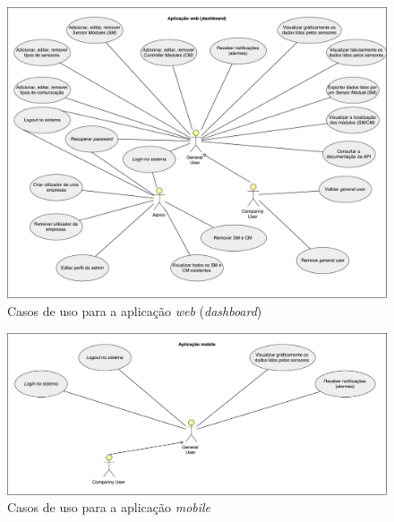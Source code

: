 \begin{figure}[!htb]
	\centering
	\includegraphics[width=\linewidth]{esquemas/use-case-web.pdf}
	\caption{Casos de uso para a aplicação \textit{web} (\textit{dashboard}) }
	\label{usedash}
\end{figure}




\begin{figure}[!htb]
	\centering
	\includegraphics[width=\linewidth]{esquemas/use-case-mobile.pdf}
	\caption{Casos de uso para a aplicação \textit{mobile}}
	\label{useMobile}
\end{figure}




\newpage

